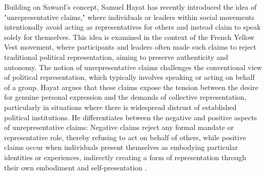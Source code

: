 Building on Saward's concept, Samuel Hayat has recently introduced the idea of "unrepresentative claims," where individuals or leaders within social movements intentionally avoid acting as representatives for others and instead claim to speak solely for themselves. This idea is examined in the context of the French Yellow Vest movement, where participants and leaders often made such claims to reject traditional political representation, aiming to preserve authenticity and autonomy. The notion of unrepresentative claims challenges the conventional view of political representation, which typically involves speaking or acting on behalf of a group. Hayat argues that these claims expose the tension between the desire for genuine personal expression and the demands of collective representation, particularly in situations where there is widespread distrust of established political institutions. He differentiates between the negative and positive aspects of unrepresentative claims: Negative claims reject any formal mandate or representative role, thereby refusing to act on behalf of others, while positive claims occur when individuals present themselves as embodying particular identities or experiences, indirectly creating a form of representation through their own embodiment and self-presentation \parencite[see 1038-1043]{hayat2022}.

